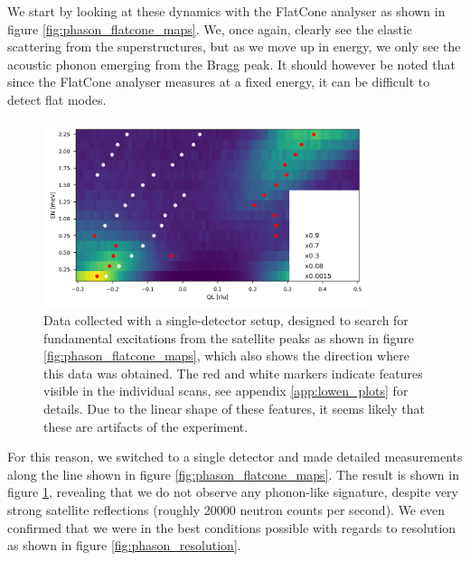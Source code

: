We start by looking at these dynamics with the FlatCone analyser as shown in figure \ref{fig:phason_flatcone_maps}. We, once again, clearly see the elastic scattering from the superstructures, but as we move up in energy, we only see the acoustic phonon emerging from the Bragg peak. It should however be noted that since the FlatCone analyser measures at a fixed energy, it can be difficult to detect flat modes.

\begin{figure}
    \centering
    \includegraphics[width=0.85\textwidth]{fig/lowen/phason_colorplot.png}
    \caption[lack of phasons]{Data collected with a single-detector setup, designed to search for fundamental excitations from the satellite peaks as shown in figure \ref{fig:phason_flatcone_maps}, which also shows the direction where this data was obtained. The red and white markers indicate features visible in the individual scans, see appendix \ref{app:lowen_plots} for details. Due to the linear shape of these features, it seems likely that these are artifacts of the experiment.}
    \label{fig:lcoo_phasons_colorplot}
\end{figure}

For this reason, we switched to a single detector and made detailed measurements along the line shown in figure \ref{fig:phason_flatcone_maps}. The result is shown in figure \ref{fig:lcoo_phasons_colorplot}, revealing that we do not observe any phonon-like signature, despite very strong satellite reflections (roughly 20000 neutron counts per second). We even confirmed that we were in the best conditions possible with regards to resolution as shown in figure \ref{fig:phason_resolution}.

